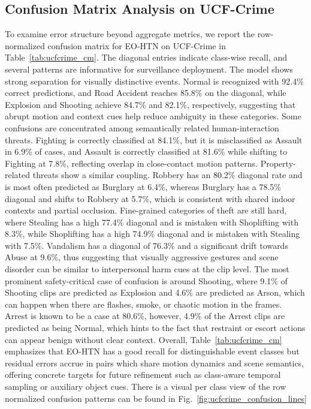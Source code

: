 \documentclass[AMA,Times1COL]{WileyNJDv5} %
\begin{document}
\subsection{Confusion Matrix Analysis on UCF-Crime}
To examine error structure beyond aggregate metrics, we report the row-normalized confusion matrix for EO-HTN on UCF-Crime in Table~\ref{tab:ucfcrime_cm}. The diagonal entries indicate class-wise recall, and several patterns are informative for surveillance deployment. The model shows strong separation for visually distinctive events. Normal is recognized with 92.4\% correct predictions, and Road Accident reaches 85.8\% on the diagonal, while Explosion and Shooting achieve 84.7\% and 82.1\%, respectively, suggesting that abrupt motion and context cues help reduce ambiguity in these categories. Some confusions are concentrated among semantically related human-interaction threats. Fighting is correctly classified at 84.1\%, but it is misclassified as Assault in 6.9\% of cases, and Assault is correctly classified at 81.6\% while shifting to Fighting at 7.8\%, reflecting overlap in close-contact motion patterns. Property-related threats show a similar coupling. Robbery has an 80.2\% diagonal rate and is most often predicted as Burglary at 6.4\%, whereas Burglary has a 78.5\% diagonal and shifts to Robbery at 5.7\%, which is consistent with shared indoor contexts and partial occlusion. Fine-grained categories of theft are still hard, where Stealing has a high 77.4\% diagonal and is mistaken with Shoplifting with 8.3\%, while Shoplifting has a high 74.9\% diagonal and is mistaken with Stealing with 7.5\%. Vandalism has a diagonal of 76.3\% and a significant drift towards Abuse at 9.6\%, thus suggesting that visually aggressive gestures and scene disorder can be similar to interpersonal harm cues at the clip level. The most prominent safety-critical case of confusion is around Shooting, where 9.1\% of Shooting clips are predicted as Explosion and 4.6\% are predicted as Arson, which can happen when there are flashes, smoke, or chaotic motion in the frames. Arrest is known to be a case at 80.6\%, however, 4.9\% of the Arrest clips are predicted as being Normal, which hints to the fact that restraint or escort actions can appear benign without clear context. Overall, Table~\ref{tab:ucfcrime_cm} emphasizes that EO-HTN has a good recall for distinguishable event classes but residual errors accrue in pairs which share motion dynamics and scene semantics, offering concrete targets for future refinement such as class-aware temporal sampling or auxiliary object cues. There is a visual per class view of the row normalized confusion patterns can be found in Fig.~\ref{fig:ucfcrime_confusion_lines}
\end{document}
